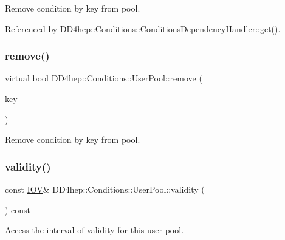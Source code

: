 Remove condition by key from pool. 



Referenced by D\+D4hep\+::\+Conditions\+::\+Conditions\+Dependency\+Handler\+::get().

\hypertarget{class_d_d4hep_1_1_conditions_1_1_user_pool_ac8f9ef22b7ec455e7ab56d05dc43af77}{}\label{class_d_d4hep_1_1_conditions_1_1_user_pool_ac8f9ef22b7ec455e7ab56d05dc43af77} 
\subsubsection{\texorpdfstring{remove()}{remove()}\hspace{0.1cm}{\footnotesize\ttfamily [2/2]}}
{\footnotesize\ttfamily virtual bool D\+D4hep\+::\+Conditions\+::\+User\+Pool\+::remove (\begin{DoxyParamCaption}\item[{const \hyperlink{class_d_d4hep_1_1_conditions_1_1_condition_key}{Condition\+Key} \&}]{key }\end{DoxyParamCaption})\hspace{0.3cm}{\ttfamily [pure virtual]}}



Remove condition by key from pool. 

\hypertarget{class_d_d4hep_1_1_conditions_1_1_user_pool_ab434e53fd487793e21f376d7b7bac52c}{}\label{class_d_d4hep_1_1_conditions_1_1_user_pool_ab434e53fd487793e21f376d7b7bac52c} 
\subsubsection{\texorpdfstring{validity()}{validity()}}
{\footnotesize\ttfamily const \hyperlink{class_d_d4hep_1_1_i_o_v}{I\+OV}\& D\+D4hep\+::\+Conditions\+::\+User\+Pool\+::validity (\begin{DoxyParamCaption}{ }\end{DoxyParamCaption}) const\hspace{0.3cm}{\ttfamily [inline]}}



Access the interval of validity for this user pool. 



